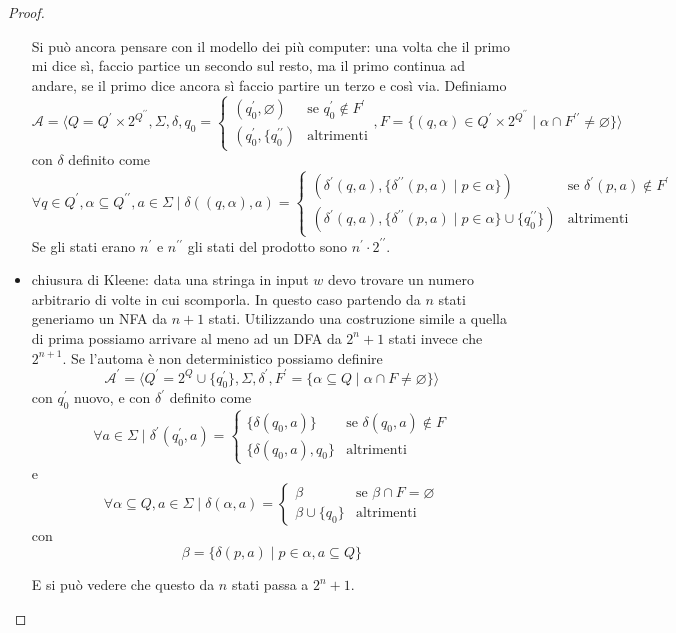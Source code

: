 \documentclass[12pt]{article}
\begin{document}
\begin{proof}
\begin{itemize}
			Si può ancora pensare con il modello dei più computer: una volta che il primo mi dice sì, faccio partice un secondo sul resto, ma il primo continua ad andare, se il primo dice ancora sì faccio partire un terzo e così via.
			Definiamo 
			$$ \mathcal{A} = \langle Q = Q^\prime \times 2^{Q^{\prime\prime}}, \Sigma, \delta, q_0 = \begin{cases} (q_0^\prime, \varnothing) & \text{se } q_0^\prime \not \in F^\prime \\ (q_0^\prime, \{q_0^{\prime\prime}) & \text{altrimenti} \end{cases}, F = \{ (q, \alpha) \in Q^\prime \times 2^{Q^{\prime\prime}} \mid \alpha \cap F^{\prime\prime} \neq \varnothing \} \rangle $$
			con $\delta$ definito come
			$$ \forall q \in Q^\prime, \alpha \subseteq Q^{\prime\prime}, a \in \Sigma \mid \delta((q, \alpha), a) = 
			\begin{cases}
				(\delta^\prime(q, a), \{ \delta^{\prime\prime}(p, a) \mid p \in \alpha \} ) & \text{se } \delta^\prime(p, a) \not \in F^\prime \\
				(\delta^\prime(q, a), \{ \delta^{\prime\prime}(p, a) \mid p \in \alpha \} \cup \{q_0^{\prime\prime}\} ) & \text{altrimenti}
			\end{cases}
			$$
			Se gli stati erano $n^\prime$ e $n^{\prime\prime}$ gli stati del prodotto sono $n^\prime \cdot 2^{\prime\prime}$.

		\item chiusura di Kleene: data una stringa in input $w$ devo trovare un numero arbitrario di volte in cui scomporla.
			In questo caso partendo da $n$ stati generiamo un NFA da $n + 1$ stati.
			Utilizzando una costruzione simile a quella di prima possiamo arrivare al meno ad un DFA da $2^n + 1$ stati invece che $2^{n + 1}$.
			Se l'automa è non deterministico possiamo definire
			$$ \mathcal{A}^\prime = \langle Q^\prime = 2^{Q} \cup \{ q_0^\prime \}, \Sigma, \delta^\prime, F^\prime = \{ \alpha \subseteq Q \mid \alpha \cap F \neq \varnothing \} \rangle $$
			con $q_0^\prime$ nuovo, e con $\delta^\prime$ definito come
			$$ \forall a \in \Sigma \mid \delta^\prime(q_0^\prime, a) = 
			\begin{cases}
				\{ \delta(q_0, a) \} & \text{se } \delta(q_0, a) \not \in F \\
				\{ \delta(q_0, a), q_0\} & \text{altrimenti}
			\end{cases}
			$$
			e 
			$$ \forall \alpha \subseteq Q, a \in \Sigma \mid \delta(\alpha, a) = 
			\begin{cases}
				\beta & \text{se } \beta \cap F = \varnothing \\
				\beta \cup \{q_0\} & \text{altrimenti}
			\end{cases}
			$$
			con
			$$ \beta = \{ \delta(p, a) \mid p \in \alpha, a \subseteq Q \} $$

			E si può vedere che questo da $n$ stati passa a $2^n + 1$.
	\end{itemize}
\end{proof}
\end{document}
